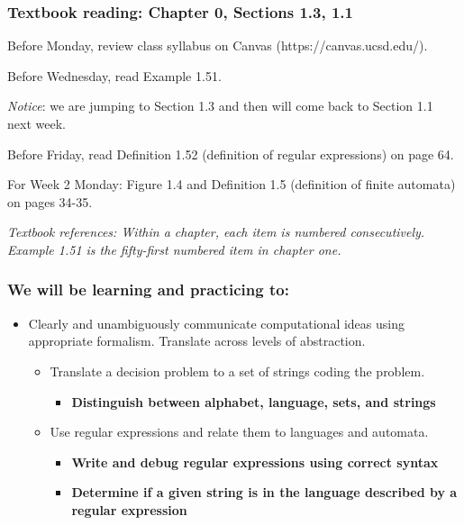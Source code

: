 \subsubsection*{Textbook reading: Chapter 0, Sections 1.3, 1.1}

\vspace{-15pt}

Before Monday, review class syllabus on Canvas (https://canvas.ucsd.edu/).

Before Wednesday, read Example 1.51.

{\it Notice}: we are jumping to Section 1.3 and then will come back 
to Section 1.1 next week.

Before Friday, read Definition 1.52 (definition of regular expressions) on page 64.

For Week 2 Monday: Figure 1.4 and Definition 1.5 (definition of finite automata) on pages 34-35.

{\it Textbook references: Within a chapter, each item is numbered consecutively. Example 1.51 is the fifty-first numbered item in chapter one.}


\subsubsection*{We will be learning and practicing to:}
\begin{itemize}
\item Clearly and unambiguously communicate computational ideas using appropriate formalism. Translate across levels of abstraction.
\begin{itemize}
   \item Translate a decision problem to a set of strings coding the problem.
   \begin{itemize}
      \item {\bf Distinguish between alphabet, language, sets, and strings}
   \end{itemize}
   \item Use regular expressions and relate them to languages and automata.
   \begin{itemize}
      \item {\bf Write and debug regular expressions using correct syntax}
      \item {\bf Determine if a given string is in the language described by a regular expression}
   \end{itemize}
\end{itemize}
\end{itemize}

